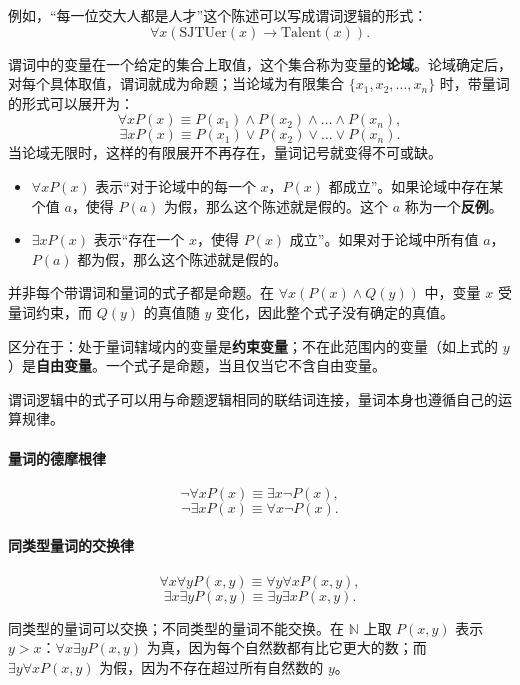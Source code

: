 例如，“每一位交大人都是人才”这个陈述可以写成谓词逻辑的形式：
\[
\forall x(\text{SJTUer}(x)\to \text{Talent}(x)).
\]

谓词中的变量在一个给定的集合上取值，这个集合称为变量的\textbf{论域}。论域确定后，对每个具体取值，谓词就成为命题；当论域为有限集合 $\{x_1,x_2,\dots,x_n\}$ 时，带量词的形式可以展开为：
\[
\forall x P(x)\equiv P(x_1)\wedge P(x_2)\wedge\dots\wedge P(x_n),
\]
\[
\exists x P(x)\equiv P(x_1)\vee P(x_2)\vee\dots\vee P(x_n).
\]
当论域无限时，这样的有限展开不再存在，量词记号就变得不可或缺。

\begin{itemize}
    \item $\forall xP(x)$ 表示“对于论域中的每一个 $x$，$P(x)$ 都成立”。如果论域中存在某个值 $a$，使得 $P(a)$ 为假，那么这个陈述就是假的。这个 $a$ 称为一个\textbf{反例}。
    \item $\exists xP(x)$ 表示“存在一个 $x$，使得 $P(x)$ 成立”。如果对于论域中所有值 $a$，$P(a)$ 都为假，那么这个陈述就是假的。
\end{itemize}

并非每个带谓词和量词的式子都是命题。在 $\forall x(P(x)\wedge Q(y))$ 中，变量 $x$ 受量词约束，而 $Q(y)$ 的真值随 $y$ 变化，因此整个式子没有确定的真值。

区分在于：处于量词辖域内的变量是\textbf{约束变量}；不在此范围内的变量（如上式的 $y$）是\textbf{自由变量}。一个式子是命题，当且仅当它不含自由变量。

谓词逻辑中的式子可以用与命题逻辑相同的联结词连接，量词本身也遵循自己的运算规律。

\paragraph{量词的德摩根律}
\[
\neg\forall xP(x)\equiv\exists x\neg P(x),
\]
\[
\neg\exists xP(x)\equiv\forall x\neg P(x).
\]

\paragraph{同类型量词的交换律}
\[
\forall x\forall yP(x,y)\equiv\forall y\forall xP(x,y),
\]
\[
\exists x\exists yP(x,y)\equiv\exists y\exists xP(x,y).
\]

\begin{note}
同类型的量词可以交换；不同类型的量词不能交换。在 $\mathbb{N}$ 上取 $P(x,y)$ 表示 $y>x$：$\forall x\exists yP(x,y)$ 为真，因为每个自然数都有比它更大的数；而 $\exists y\forall xP(x,y)$ 为假，因为不存在超过所有自然数的 $y$。
\end{note}

